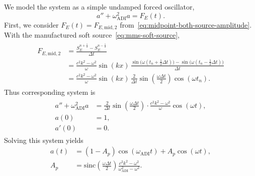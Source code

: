 \documentclass{article}
\numberwithin{figure}{section}
\begin{document}
We model the system as a simple undamped forced oscillator,
\begin{equation}
    a''+\omega_{\mathrm{ADI}}^2 a=F_E(t).
    \label{eq:forced-oscillator}
\end{equation}
First, we consider $F_E(t)=F_{E,\mathrm{mid,2}}$ from~\eqref{eq:midpoint-both-source-amplitude}.
With the manufactured soft source~\eqref{eq:mms-soft-source},
\begin{align}
    \begin{split}
        F_{E,\mathrm{mid,2}}
         & =\frac{S_E^{n+\frac{1}{2}}-S_E^{n-\frac{1}{2}}}{\Delta t}                                                   \\
         & =\frac{c^2k^2-\omega^2}{\omega}\sin(kx)\,
        \frac{\sin\bigl(\omega(t_n+\tfrac12\Delta t)\bigr)-\sin\bigl(\omega(t_n-\tfrac12\Delta t)\bigr)}{\Delta t} \\
         & =\frac{c^2k^2-\omega^2}{\omega}\sin(kx)\,
        \frac{2}{\Delta t}\sin\left(\frac{\omega\Delta t}{2}\right)\cos(\omega t_n).
    \end{split}
    \label{eq:mms-F-mid2-real}
\end{align}
Thus corresponding system is
\begin{align}
    \begin{split}
        a''+\omega_{\mathrm{ADI}}^2 a
         & =\frac{2}{\Delta t}\sin\left(\frac{\omega\Delta t}{2}\right)\cdot\frac{c^2k^2-\omega^2}{\omega}\cos(\omega t), \\
        a(0)
         & =1,                                                                                                            \\
        a'(0)
         & =0.
    \end{split}
    \label{eq:mms-forced-mid2}
\end{align}
Solving this system yields
\begin{equation}
    \begin{aligned}
        a(t)
         & =\left(1-A_p\right)\cos(\omega_{\mathrm{ADI}}t)+A_p\cos(\omega t),                                           \\
        A_p
         & =\mathrm{sinc}\left(\frac{\omega\Delta t}{2}\right)\frac{c^2k^2-\omega^2}{\omega_{\mathrm{ADI}}^2-\omega^2}.
    \end{aligned}
    \label{eq:mms-solution-mid2}
\end{equation}
\end{document}
